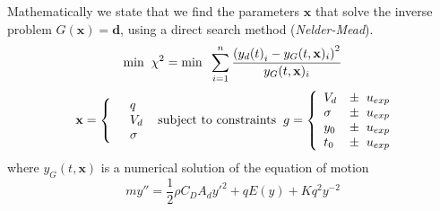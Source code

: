 \documentclass[12pt,a4paper,oneside]{book}
\begin{document}
Mathematically we state that we find the parameters $\mathbf{x}$ that solve the inverse problem $G(\mathbf{x}) = \mathbf{d}$, using a direct search method (\emph{Nelder-Mead}). 
\[
\mbox{min} \hspace{2 mm} \chi^2 = \mbox{min} \hspace{2 mm} \sum^n_{i=1} \frac{\left({y_d(t)}_i - y_G(t, \mathbf{x})_i \right)^2}{y_G(t, \mathbf{x})_i}
\]
\begin{eqnarray*} \mbox{} \hspace{2 mm} \begin{split} \mathbf{x} = \left\{ \begin{array}{ll}      & q\\
		  &	V_d\\
          & \sigma 
          \end{array} \right. 
          \end{split} \hspace{2 mm} \mbox{subject to constraints} \hspace{2 mm} \begin{split}
          g = \left\{ \begin{array}{ll}
           V_d &\pm \hspace{2 mm} u_{exp}\\
      	   \sigma &\pm  \hspace{2 mm} u_{exp}\\
      	   y_0 &\pm \hspace{2 mm} u_{exp}\\
      	   t_0 &\pm \hspace{2 mm} u_{exp}\\
          \end{array} \right. 
          \end{split}
\end{eqnarray*}
where $y_G(t, \mathbf{x})$ is a numerical solution of the equation of motion
\[
m y'' = \frac{1}{2} \rho C_D A_d {y'}^2 + q E(y) + K q^2 y^{-2} \]
\end{document}
